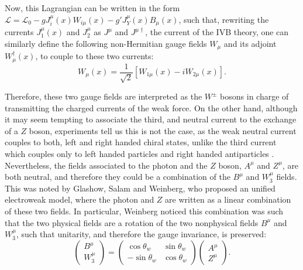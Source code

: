 Now, this Lagrangian can be written in the form $\mathcal{L} = \mathcal{L}_0 - gJ^{\mu}_i(x)W_{i\mu}(x) - g'J^{\mu}_Y(x)B_{\mu}(x)$, such that, rewriting the currents $J^{\mu}_1(x)$ and $J^{\mu}_2$ as $J^{\mu}$ and $J^{\mu\dagger}$, the current of the IVB theory, one can similarly define the following non-Hermitian gauge fields $W_{\mu}$ and its adjoint $W_{\mu}^{\dagger}(x)$, to couple to these two currents:
\begin{equation*}
    W_{\mu}(x) = \dfrac{1}{\sqrt{2}}[W_{1\mu}(x) - iW_{2\mu}(x)].
\end{equation*}

Therefore, these two gauge fields are interpreted as the $W^{\pm}$ bosons in charge of transmitting the charged currents of the weak force. On the other hand, although it may seem tempting to associate the third, and neutral current to the exchange of a $Z$ boson, experiments tell us this is not the case, as the weak neutral current couples to both, left and right handed chiral states, unlike the third current which couples only to left handed particles and right handed antiparticles \cite{Thomson}. Nevertheless, the fields associated to the photon and the $Z$ boson, $A^{\mu}$ and $Z^{\mu}$, are both neutral, and therefore they could be a combination of the $B^{\mu}$ and $W^{\mu}_3$ fields. This was noted by Glashow, Salam and Weinberg, who proposed an unified electroweak model, where the photon and $Z$ are written as a linear combination of these two fields. In particular, Weinberg noticed this combination was such that the two physical fields are a rotation of the two nonphysical fields $B^{\mu}$ and $W^{\mu}_3$, such that unitarity, and therefore the gauge invariance, is preserved:
\begin{equation*}
\left( \begin{array}{c}
B^{\mu} \\
W^{\mu}_3 \end{array} \right) = \left( \begin{array}{ccc}
\cos{\theta_w} & \sin{\theta_w} \\
-\sin{\theta_w} & \cos{\theta_w} \end{array} \right)
\left( \begin{array}{c}
A^{\mu} \\
Z^{\mu} \end{array} \right).
\end{equation*}


